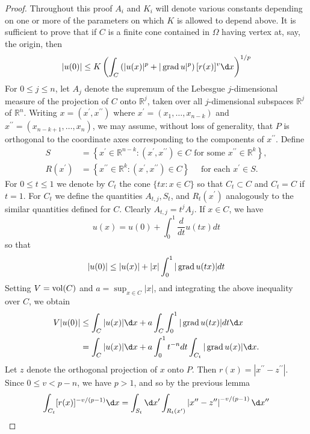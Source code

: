 \begin{proof}
  Throughout this proof $A_i$ and $K_i$ will denote various constants depending on one or more of the parameters on which $K$ is allowed to depend above. It is
  sufficient to prove that if $C$ is a finite cone contained in $\Omega$ having vertex at, say, the origin, then
  \[
  |u(0)| \leq K\left(\int_C\left(|u(x)|^p+|\grad u|^p\right)[r(x)]^v \d x\right)^{1 / p}
  \]
  For $0 \leq j \leq n$, let $A_j$ denote the supremum of the Lebesgue $j$-dimensional measure of the projection of $C$ onto $\mathbb{R}^j$, taken over all $j$-dimensional subspaces $\mathbb{R}^j$ of $\mathbb{R}^n$. Writing $x=\left(x^{\prime}, x^{\prime \prime}\right)$ where $x^{\prime}=\left(x_1, \ldots, x_{n-k}\right)$ and $x^{\prime \prime}=\left(x_{n-k+1}, \ldots, x_n\right)$, we may assume, without loss of generality, that $P$ is orthogonal to the coordinate axes corresponding to the components of $x^{\prime \prime}$. Define
  \[
  \begin{aligned}
  S & =\left\{x^{\prime} \in \mathbb{R}^{n-k}:\left(x^{\prime}, x^{\prime \prime}\right) \in C \text { for some } x^{\prime \prime} \in \mathbb{R}^k\right\}, \\
  R\left(x^{\prime}\right) & =\left\{x^{\prime \prime} \in \mathbb{R}^k:\left(x^{\prime}, x^{\prime \prime}\right) \in C\right\} \quad \text { for each } x^{\prime} \in S .
  \end{aligned}
  \]
  For $0 \leq t \leq 1$ we denote by $C_t$ the cone $\{t x: x \in C\}$ so that $C_t \subset C$ and $C_t=C$ if $t=1$. For $C_t$ we define the quantities $A_{t, j}, S_t$, and $R_t\left(x^{\prime}\right)$ analogously to the similar quantities defined for $C$. Clearly $A_{t, j}=t^j A_j$. If $x \in C$, we have
  \[
  u(x)=u(0)+\int_0^1 \frac{d}{d t} u(t x) d t
  \]
  so that
  \[
  |u(0)| \leq|u(x)|+|x| \int_0^1|\operatorname{grad} u(t x)| d t
  \]
  Setting $V=\operatorname{vol}(C)$ and $a=\sup _{x \in C}|x|$, and integrating the above inequality over $C$, we obtain
  \[
  \begin{aligned}
  V|u(0)| & \leq \int_C|u(x)| \d x+a \int_C \int_0^1|\grad u(t x)| d t \d x \\
  & =\int_C|u(x)| \d x+a \int_0^1 t^{-n} d t \int_{C_t}|\grad u(x)| \d x .
  \end{aligned}
  \]
  Let $z$ denote the orthogonal projection of $x$ onto $P$. Then $r(x)=\left|x^{\prime \prime}-z^{\prime \prime}\right|$. Since $0 \leq v<p-n$, we have $p>1$, and so by the previous lemma
  \[
  \begin{aligned}
  \int_{C_t}[r(x)]^{-v /(p-1)} \d x & =\int_{S_t} \d x^{\prime} \int_{R_t\left(x^{\prime}\right)}\left|x^{\prime \prime}-z^{\prime \prime}\right|^{-v /(p-1)} \d x^{\prime \prime} \\

\end{aligned}\]
\end{proof}
